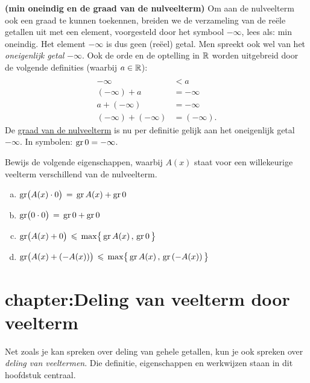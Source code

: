 \documentclass{ximera}
\begin{document}
\clearpage

\begin{Uitbreiding}
\begin{Oefening}%
\label{oefgraadnulveelterm}
{\bf (min oneindig en de graad van de nulveelterm)} 
Om aan de nulveelterm ook een graad te kunnen toekennen, breiden we de verzameling van de re\"ele getallen uit met een element, voorgesteld door het symbool $- \infty$, lees als: min oneindig. Het element $-\infty$ is dus geen (re\"eel) getal. Men spreekt ook wel van het {\em oneigenlijk getal} $-\infty$. Ook de orde en de optelling in $\mathbb{R}$ worden uitgebreid door de volgende definities (waarbij $a \in \mathbb{R}$):
\[
\begin{aligned}
\\[-0.5cm]
-\infty & < a \\
(-\infty) + a & = -\infty \\
a + (-\infty) & = -\infty \\
(-\infty) + (-\infty) & = (-\infty).
\end{aligned}
\]
De \underline{graad van de nulveelterm} is nu per definitie gelijk aan het oneigenlijk getal $-\infty$. In symbolen: $\operatorname{gr} 0 = - \infty$.

Bewijs de volgende eigenschappen, waarbij $A(x)$ staat voor een willekeurige veelterm verschillend van de nulveelterm.
\begin{enumerate}[(a)]
\item
$\operatorname{gr}\bigl( A(x) \cdot 0 \bigr) \, = \, \operatorname{gr} A(x) + \operatorname{gr} 0$
\item
$\operatorname{gr}\bigl( 0 \cdot 0 \bigr) \, = \, \operatorname{gr} 0 + \operatorname{gr} 0$
\item
$\displaystyle \operatorname{gr}\bigl( A(x) + 0 \bigr) \, \leqslant \, \max \bigl\{ \,\operatorname{gr} A(x)\, , \, \operatorname{gr} 0 \, \bigr\}$
\item
$\displaystyle \operatorname{gr}\bigl( A(x) + (-A(x)) \bigr) \, \leqslant \, \max \bigl\{ \,\operatorname{gr} A(x)\, , \, \operatorname{gr} \left(-A(x)\right) \, \bigr\}$
\end{enumerate}
\end{Oefening}
\end{Uitbreiding}

\section{chapter:Deling van veelterm door veelterm}\label{hoofdstuk:2}

Net zoals je kan spreken over deling van gehele getallen, kun je ook spreken over {\em deling van veeltermen}. Die definitie, eigenschappen en werkwijzen staan in dit hoofdstuk centraal. 
\end{document}
